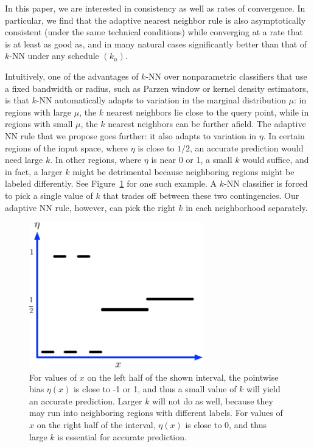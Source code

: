 \documentclass{article}
\begin{document}
In this paper, we are interested in consistency as well as rates of
convergence. In particular, we find that the adaptive nearest neighbor
rule is also asymptotically consistent (under the same technical
conditions) while converging at a rate that is at least as good as,
and in many natural cases significantly better than that of $k$-NN
under any schedule $(k_n)$.

Intuitively, one of the advantages of $k$-NN over nonparametric
classifiers that use a fixed bandwidth or radius, such as Parzen
window or kernel density estimators, is that $k$-NN automatically
adapts to variation in the marginal distribution $\mu$: in regions
with large $\mu$, the $k$ nearest neighbors lie close to the query
point, while in regions with small $\mu$, the $k$ nearest neighbors
can be further afield. The adaptive NN rule that we propose goes
further: it also adapts to variation in $\eta$. In certain regions of
the input space, where $\eta$ is close to $1/2$, an accurate
prediction would need large $k$. In other regions, where $\eta$ is
near 0 or 1, a small $k$ would suffice, and in fact, a larger $k$
might be detrimental because neighboring regions might be labeled
differently. See Figure~\ref{fig:rationale} for one such example. A
$k$-NN classifier is forced to pick a single value of $k$ that trades
off between these two contingencies. Our adaptive NN rule, however,
can pick the right $k$ in each neighborhood separately.

\begin{figure}
\begin{center}
\includegraphics[width=3in]{adaptive-rationale.pdf}
\end{center}
\caption{For values of $x$ on the left half of the shown interval, the
  pointwise bias $\eta(x)$ is close to -1 or 1, and thus a small value of $k$ will yield an accurate prediction. Larger $k$ will not do as well, because they may run into neighboring regions with different labels. For values of $x$ on the right half of the interval, $\eta(x)$ is close to $0$, and thus large $k$ is essential for accurate prediction.}
\label{fig:rationale}
\end{figure}
\end{document}
